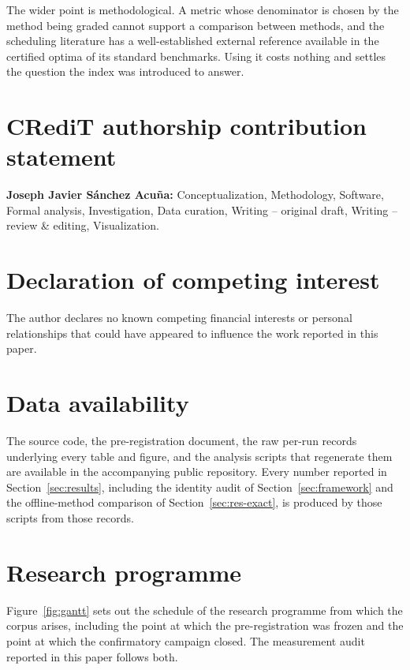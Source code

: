 \documentclass[a4paper,fleqn]{cas-sc}
\begin{document}
The wider point is methodological. A metric whose denominator is chosen by the
method being graded cannot support a comparison between methods, and the
scheduling literature has a well-established external reference available in the
certified optima of its standard benchmarks. Using it costs nothing and settles
the question the index was introduced to answer.

\section*{CRediT authorship contribution statement}

\textbf{Joseph Javier Sánchez Acuña:} Conceptualization, Methodology, Software,
Formal analysis, Investigation, Data curation, Writing -- original draft,
Writing -- review \& editing, Visualization.

\section*{Declaration of competing interest}

The author declares no known competing financial interests or personal
relationships that could have appeared to influence the work reported in this
paper.

\section*{Data availability}

The source code, the pre-registration document, the raw per-run records
underlying every table and figure, and the analysis scripts that regenerate them
are available in the accompanying public repository. Every number reported in
Section~\ref{sec:results}, including the identity audit of
Section~\ref{sec:framework} and the offline-method comparison of
Section~\ref{sec:res-exact}, is produced by those scripts from those records.

\appendix

\section{Research programme}\label{app:gantt}

Figure~\ref{fig:gantt} sets out the schedule of the research programme from
which the corpus arises, including the point at which the pre-registration was
frozen and the point at which the confirmatory campaign closed. The measurement
audit reported in this paper follows both.
\end{document}
